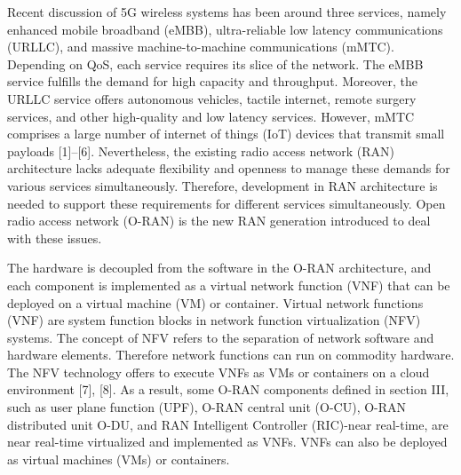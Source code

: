 \documentclass[12pt, letterpaper]{article}
\begin{document}
Recent discussion of 5G wireless systems has been around three services, namely enhanced mobile broadband (eMBB), ultra-reliable low latency communications (URLLC), and massive machine-to-machine communications (mMTC). Depending on QoS, each service requires its slice of the network.
The eMBB service fulfills the demand for high capacity and throughput. Moreover, the URLLC service offers autonomous vehicles, tactile internet, remote surgery services, and other high-quality and low latency services. However, mMTC comprises a large number of internet of things (IoT) devices that transmit small payloads
[1]–[6].
Nevertheless, the existing radio access network (RAN) architecture lacks adequate flexibility and openness to manage these demands for various services simultaneously. Therefore, development in RAN architecture is needed to support these requirements for different services simultaneously. Open radio access network (O-RAN) is the new RAN generation introduced to deal with these issues.

The hardware is decoupled from the software in the O-RAN architecture, and each component is implemented as a virtual network function (VNF) that can be deployed on a virtual machine (VM) or container. 
Virtual network functions (VNF) are system function blocks in network function virtualization (NFV) systems. The concept of NFV refers to the separation of network software and hardware elements. Therefore network functions can run on commodity hardware. The NFV technology offers to execute VNFs as VMs or containers on a cloud environment [7], [8].
As a result, some O-RAN components defined in section III, such as user plane function (UPF), O-RAN central unit (O-CU), O-RAN distributed unit O-DU, and RAN Intelligent Controller (RIC)-near real-time, are near real-time virtualized and implemented as VNFs. VNFs can also be deployed as virtual machines (VMs) or containers.
\end{document}
